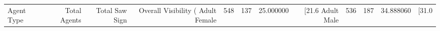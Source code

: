 \begin{tabular}{lrrrlrrrlrrr}
\toprule
Agent Type & Total Agents & Total Saw Sign & Overall Visibility (%
\midrule
Adult Female & 548 & 137 & 25.000000 & [21.6%
Adult Male & 536 & 187 & 34.888060 & [31.0%
\bottomrule
\end{tabular}
